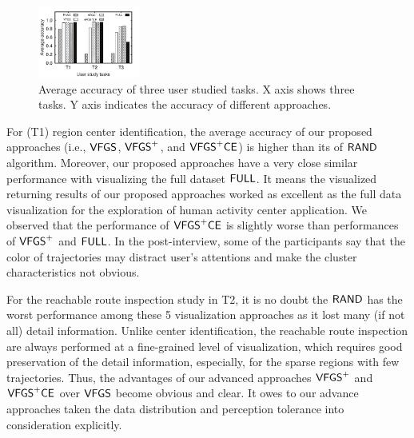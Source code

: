 \begin{figure}[t]
	\centering
	\includegraphics[width=0.3\textwidth]{pictures/userstudy}
	\vspace{-4mm}
	\caption{Average accuracy of three user studied tasks. X axis shows three tasks. Y axis indicates the accuracy of different approaches.}
	\label{fig:accuracy}
	\vspace{-6mm}
\end{figure}

For (T1) region center identification, the average accuracy of our proposed approaches (i.e., $\mathsf{VFGS}$, $\mathsf{VFGS}^{+}$, and $\mathsf{VFGS}^{+}\mathsf{CE}$) is higher than its of $\mathsf{RAND}{}$ algorithm.
Moreover, our proposed approaches have a very close similar performance with visualizing the full dataset $\mathsf{FULL}$.
It means the visualized returning results of our proposed approaches worked as excellent as the full data visualization for the exploration of human activity center application.
We observed that the performance of $\mathsf{VFGS}^{+}\mathsf{CE}$ is slightly worse than performances of $\mathsf{VFGS}^{+}$ and $\mathsf{FULL}$.
In the post-interview, some of the participants say that the color of trajectories may distract user's attentions and make the cluster characteristics not obvious.



For the reachable route inspection study in T2, it is no doubt the $\mathsf{RAND}$ has the worst performance among these 5 visualization approaches as it lost many (if not all) detail information.
Unlike center identification, the reachable route inspection are always performed at a fine-grained level of visualization,
which requires good preservation of the detail information, especially, for the sparse regions with few trajectories.
Thus, the advantages of our advanced approaches $\mathsf{VFGS}^{+}$ and $\mathsf{VFGS}^{+}\mathsf{CE}$ over $\mathsf{VFGS}$ become obvious and clear.
It owes to our advance approaches taken the data distribution and perception tolerance into consideration explicitly.

